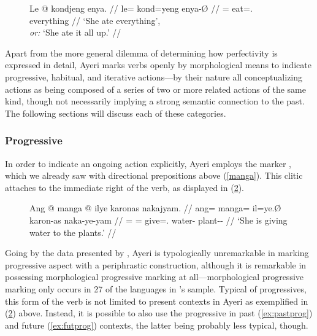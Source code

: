 \begin{figure}[h]
\ex\label{ex:entirepfv}\begingl
	\gla Le @ kondjeng enya. //
	\glb le= kond=yeng enya-Ø //
	\glc \PatTI{}= eat=\TsgF{}.\Aarg{} everything //
	\glft `She ate everything', \\
		\textit{or:} `She ate it all up.' //
\endgl\xe
\end{figure}

Apart from the more general dilemma of determining how perfectivity is
expressed in detail, Ayeri marks verbs openly by morphological means to
indicate progressive, habitual, and iterative actions---by their nature all
conceptualizing actions as being composed of a series of two or more related
actions of the same kind, though not necessarily implying a strong semantic
connection to the past. The following sections will discuss each of these
categories.

\subsubsection{Progressive}

In order to indicate an ongoing action explicitly, Ayeri employs the marker
, which we already saw with directional prepositions above
(\autoref{manga}). This clitic attaches to the immediate right of the verb, as
displayed in (\ref{ex:presprog}).

\begin{figure}[h]
\ex\label{ex:presprog}\begingl
	\gla Ang @ manga @ ilye karonas nakajyam. //
	\glb ang= manga= il=ye.Ø karon-as naka-ye-yam //
	\glc \AgtT{}= \Prog{}= give=\TsgF{}.\Top{} water-\Parg{} 
		plant-\Pl{}-\Dat{} //
	\glft `She is giving water to the plants.' //
\endgl\xe
\end{figure}

Going by the data presented by \citet[91]{dahl1985}, Ayeri is typologically
unremarkable in marking progressive aspect with a periphrastic construction,
although it is remarkable in possessing morphological progressive marking at
all---morphological progressive marking only occurs in 27\pct{} of the
languages in \citet{dahl1985}'s sample. Typical of progressives, this form of
the verb is not limited to present contexts in Ayeri as exemplified in
(\ref{ex:presprog}) above. Instead, it is possible to also use the progressive
in past (\ref{ex:pastprog}) and future (\ref{ex:futprog}) contexts, the latter
being probably less typical, though.

